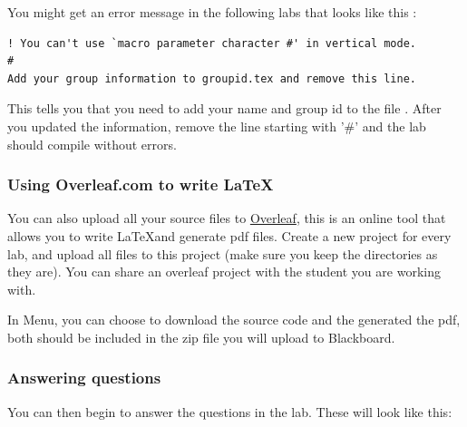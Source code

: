 \remark You might get an error message in the following labs that looks like this :
\begin{verbatim}
! You can't use `macro parameter character #' in vertical mode.
#
Add your group information to groupid.tex and remove this line.
\end{verbatim}
This tells you that you need to add your name and group id to the file . After you updated the information, remove the line starting with '\#' and the lab should compile without errors.

\subsubsection{Using Overleaf.com to write \LaTeX}
You can also upload all your source files to \href{https://overleaf.com}{Overleaf}, this is an online tool that allows you to write \LaTeX and generate pdf files. Create a new project for every lab, and upload all files to this project (make sure you keep the directories as they are). You can share an overleaf project with the student you are working with.

In Menu, you can choose to download the source code and the generated the pdf, both should be included in the zip file you will upload to Blackboard.

\subsubsection{Answering questions}

You can then begin to answer the questions in the lab. These will look like this:

